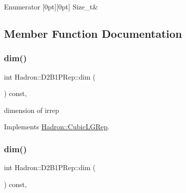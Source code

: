 \begin{DoxyEnumFields}{Enumerator}
[0pt][0pt]{}\mbox{\label{structHadron_1_1D2B1PRep_a7eefdd7b344b74f7e96914e71cff327daf46023b20380d5e86beca0a0383b96ec}} 
Size\+\_\+t&\\
\hline

\end{DoxyEnumFields}


\subsection{Member Function Documentation}
\mbox{\label{structHadron_1_1D2B1PRep_ab30c51be75c1d6ca41fa1d56c9089d2e}} 
\subsubsection{\texorpdfstring{dim()}{dim()}\hspace{0.1cm}{\footnotesize\ttfamily [1/3]}}
{\footnotesize\ttfamily int Hadron\+::\+D2\+B1\+P\+Rep\+::dim (\begin{DoxyParamCaption}{ }\end{DoxyParamCaption}) const\hspace{0.3cm}{\ttfamily [inline]}, {\ttfamily [virtual]}}

dimension of irrep 

Implements \mbox{\hyperlink{structHadron_1_1CubicLGRep_a3acbaea26503ed64f20df693a48e4cdd}{Hadron\+::\+Cubic\+L\+G\+Rep}}.

\mbox{\label{structHadron_1_1D2B1PRep_ab30c51be75c1d6ca41fa1d56c9089d2e}} 
\subsubsection{\texorpdfstring{dim()}{dim()}\hspace{0.1cm}{\footnotesize\ttfamily [2/3]}}
{\footnotesize\ttfamily int Hadron\+::\+D2\+B1\+P\+Rep\+::dim (\begin{DoxyParamCaption}{ }\end{DoxyParamCaption}) const\hspace{0.3cm}{\ttfamily [inline]}, {\ttfamily [virtual]}}

